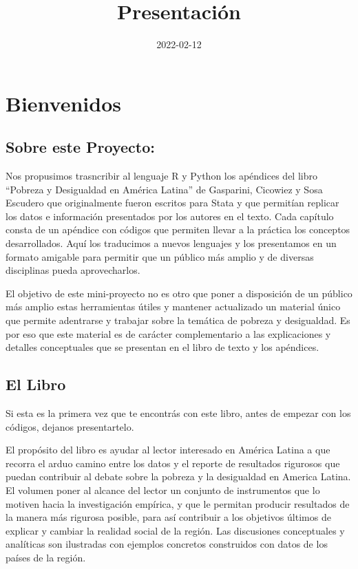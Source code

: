 \documentclass[
]{book}
\title{Presentación}
\author{}
\date{\vspace{-2.5em}2022-02-12}
\begin{document}
\maketitle

{
\setcounter{tocdepth}{1}
\tableofcontents
}
\hypertarget{bienvenidos}{%
\chapter{Bienvenidos}\label{bienvenidos}}

\hypertarget{sobre-este-proyecto}{%
\section*{Sobre este Proyecto:}\label{sobre-este-proyecto}}

Nos propusimos trasncribir al lenguaje R y Python los apéndices del libro ``Pobreza y Desigualdad en América Latina'' de Gasparini, Cicowiez y Sosa Escudero que originalmente fueron escritos para Stata y que permitían replicar los datos e información presentados por los autores en el texto. Cada capítulo consta de un apéndice con códigos que permiten llevar a la práctica los conceptos desarrollados. Aquí los traducimos a nuevos lenguajes y los presentamos en un formato amigable para permitir que un público más amplio y de diversas disciplinas pueda aprovecharlos.

El objetivo de este mini-proyecto no es otro que poner a disposición de un público más amplio estas herramientas útiles y mantener actualizado un material único que permite adentrarse y trabajar sobre la temática de pobreza y desigualdad. Es por eso que este material es de carácter complementario a las explicaciones y detalles conceptuales que se presentan en el libro de texto y los apéndices.

\hypertarget{el-libro}{%
\section*{El Libro}\label{el-libro}}

Si esta es la primera vez que te encontrás con este libro, antes de empezar con los códigos, dejanos presentartelo.

El propósito del libro es ayudar al lector interesado en América Latina a que recorra el arduo camino entre los datos y el reporte de resultados rigurosos que puedan contribuir al debate sobre la pobreza y la desigualdad en America Latina. El volumen poner al alcance del lector un conjunto de instrumentos que lo motiven hacia la investigación empírica, y que le permitan producir resultados de la manera más rigurosa posible, para así contribuir a los objetivos últimos de explicar y cambiar la realidad social de la región. Las discusiones conceptuales y analíticas son ilustradas con ejemplos concretos construidos con datos de los países de la región.
\end{document}
